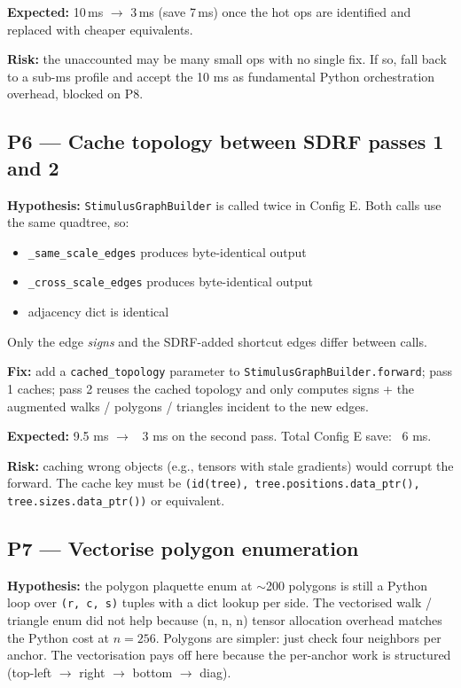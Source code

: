 \documentclass[11pt,a4paper]{article}
\begin{document}
\textbf{Expected:} 10\,ms $\to$ 3\,ms (save 7\,ms) once the hot ops
are identified and replaced with cheaper equivalents.

\textbf{Risk:} the unaccounted may be many small ops with no single
fix. If so, fall back to a sub-ms profile and accept the 10 ms as
fundamental Python orchestration overhead, blocked on P8.

\subsection{P6 --- Cache topology between SDRF passes 1 and 2}

\textbf{Hypothesis:} \texttt{StimulusGraphBuilder} is called twice
in Config E. Both calls use the same quadtree, so:

\begin{itemize}
\item \texttt{\_same\_scale\_edges} produces byte-identical output
\item \texttt{\_cross\_scale\_edges} produces byte-identical output
\item adjacency dict is identical
\end{itemize}

Only the edge \emph{signs} and the SDRF-added shortcut edges
differ between calls.

\textbf{Fix:} add a \texttt{cached\_topology} parameter to
\texttt{StimulusGraphBuilder.forward}; pass 1 caches; pass 2 reuses
the cached topology and only computes signs + the augmented walks /
polygons / triangles incident to the new edges.

\textbf{Expected:} 9.5 ms $\to$ ~3 ms on the second pass. Total
Config E save: ~6 ms.

\textbf{Risk:} caching wrong objects (e.g., tensors with stale
gradients) would corrupt the forward. The cache key must be
\texttt{(id(tree), tree.positions.data\_ptr(), tree.sizes.data\_ptr())}
or equivalent.

\subsection{P7 --- Vectorise polygon enumeration}

\textbf{Hypothesis:} the polygon plaquette enum at $\sim$200 polygons
is still a Python loop over \texttt{(r, c, s)} tuples with a dict
lookup per side. The vectorised walk / triangle enum did not help
because (n, n, n) tensor allocation overhead matches the Python
cost at $n = 256$. Polygons are simpler: just check four neighbors
per anchor. The vectorisation pays off here because the per-anchor
work is structured (top-left $\to$ right $\to$ bottom $\to$ diag).
\end{document}

